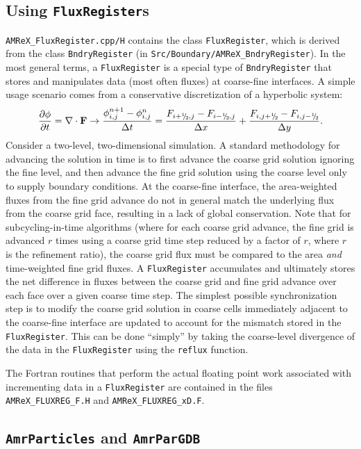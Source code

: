 \subsection{Using {\tt FluxRegister}s}
{\tt AMReX\_FluxRegister.cpp/H} contains the class {\tt FluxRegister}, which is derived from
the class {\tt BndryRegister} (in {\tt Src/Boundary/AMReX\_BndryRegister}).
In the most general terms, a {\tt FluxRegister} is a special type of {\tt BndryRegister} that
stores and manipulates data (most often fluxes) at coarse-fine interfaces.
A simple usage scenario comes from a conservative discretization of a hyperbolic system:
\begin{equation}
\frac{\partial\phi}{\partial t} = \nabla\cdot{\bf F}
\rightarrow
\frac{\phi_{i,j}^{n+1}-\phi_{i,j}^n}{\Delta t} = \frac{F_{i+\myhalf,j}-F_{i-\myhalf,j}}{\Delta x} + \frac{F_{i,j+\myhalf} - F_{i,j-\myhalf}}{\Delta y}.
\end{equation}
Consider a two-level, two-dimensional simulation.  A standard methodology for advancing the solution in 
time is to first advance the coarse grid solution ignoring the fine level, and then advance the fine 
grid solution using the coarse level only to supply boundary conditions.  At the coarse-fine interface, 
the area-weighted fluxes from the fine grid advance do not in general match the underlying flux from 
the coarse grid face, resulting in a lack of global conservation.  Note that for subcycling-in-time algorithms
(where for each coarse grid advance, the fine grid is advanced $r$ times using a coarse grid time step 
reduced by a factor of $r$, where $r$ is the refinement ratio), the coarse grid flux must 
be compared to the area {\it and} time-weighted fine grid fluxes.  A {\tt FluxRegister} accumulates 
and ultimately stores the net difference in fluxes between the coarse grid and fine grid advance over 
each face over a given coarse time step.  The simplest possible synchronization step is to modify
the coarse grid solution in coarse cells immediately adjacent to the coarse-fine interface are updated
to account for the mismatch stored in the {\tt FluxRegister}.  This can be done ``simply'' by taking
the coarse-level divergence of the data in the {\tt FluxRegister} using the {\tt reflux} function.

The Fortran routines that perform the actual floating point work associated with 
incrementing data in a {\tt FluxRegister} are
contained in the files {\tt AMReX\_FLUXREG\_F.H} and {\tt AMReX\_FLUXREG\_xD.F}.

\subsection{{\tt AmrParticles} and {\tt AmrParGDB}}

